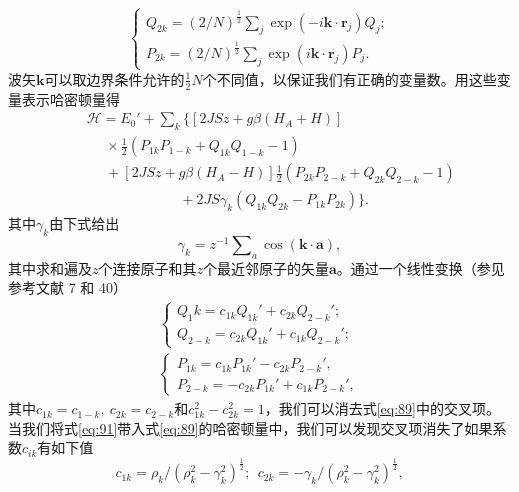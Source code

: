 \documentclass{article}
\begin{document}
\begin{equation} \label{eq:88}
\left\{
\begin{array}{l}
Q_{2k}=(2/N)^{\frac{1}{2}}\sum\nolimits_j\exp(-i\mathbf{k}\cdot\mathbf{r}_j)Q_j;\\
P_{2k}=(2/N)^{\frac{1}{2}}\sum\nolimits_j\exp(i\mathbf{k}\cdot\mathbf{r}_j)P_j.
\end{array}
\right.
\end{equation}
波矢$\mathbf{k}$可以取边界条件允许的$\tfrac{1}{2}N$个不同值，以保证我们有正确的变量数。用这些变量表示哈密顿量得
\begin{eqnarray} \label{eq:89}
&&\mathcal{H}=E_0'+\sum\nolimits_k\{[2JSz+g\beta(H_A+H)]\nonumber\\
&&~~~~~~\times\tfrac{1}{2}(P_{1k}P_{1-k}+Q_{1k}Q_{1-k}-1)\nonumber\\
&&~~~~~~+[2JSz+g\beta(H_A-H)]\tfrac{1}{2}(P_{2k}P_{2-k}+Q_{2k}Q_{2-k}-1)\nonumber\\
&&~~~~~~~~~~~~~~~~~~~~~~~~~~~~~~+2JS\gamma_k(Q_{1k}Q_{2k}-P_{1k}P_{2k})\}.
\end{eqnarray}
其中$\gamma_k$由下式给出
\begin{equation} \label{eq:90}
\gamma_k=z^{-1}\sum\nolimits_a\cos(\mathbf{k}\cdot\mathbf{a}),
\end{equation}
其中求和遍及$z$个连接原子和其$z$个最近邻原子的矢量$\mathbf{a}$。通过一个线性变换（参见参考文献 7 和 40）
\begin{equation} \label{eq:91}
\begin{array}{l}
\left\{
\begin{array}{l}
Q_1k=c_{1k}Q_{1k}'+c_{2k}Q_{2-k}';\\
Q_{2-k}=c_{2k}Q_{1k}'+c_{1k}Q_{2-k}';
\end{array}
\right.\\
\left\{
\begin{array}{l}
P_{1k}=c_{1k}P_{1k}'-c_{2k}P_{2-k}',\\
P_{2-k}=-c_{2k}P_{1k}'+c_{1k}P_{2-k}',
\end{array}
\right.
\end{array}
\end{equation}
其中$c_{1k}=c_{1-k},~c_{2k}=c_{2-k}$和$c_{1k}^2-c_{2k}^2=1$，我们可以消去式\eqref{eq:89}中的交叉项。当我们将式\eqref{eq:91}带入式\eqref{eq:89}的哈密顿量中，我们可以发现交叉项消失了如果系数$c_{ik}$有如下值
\begin{equation} \label{eq:92}
c_{1k}=\rho_k/(\rho_k^2-\gamma_k^2)^\frac{1}{2};~~c_{2k}=-\gamma_k/(\rho_k^2-\gamma_k^2)^\frac{1}{2},
\end{equation}
\end{document}
